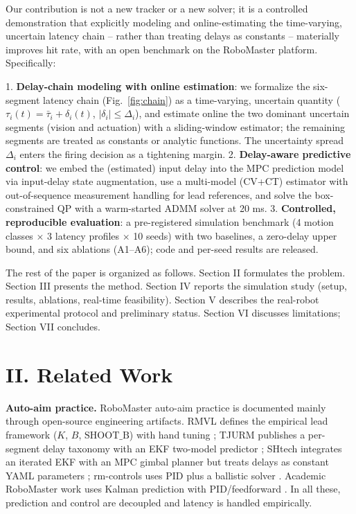 \documentclass[journal]{IEEEtran}
\begin{document}
Our contribution is not a new tracker or a new solver; it is a controlled demonstration that explicitly modeling and online-estimating the time-varying, uncertain latency chain -- rather than treating delays as constants -- materially improves hit rate, with an open benchmark on the RoboMaster platform. Specifically:

1. \textbf{Delay-chain modeling with online estimation}: we formalize the six-segment latency chain (Fig.~\ref{fig:chain}) as a time-varying, uncertain quantity ($\tau_i(t)=\bar\tau_i+\delta_i(t)$, $|\delta_i|\le\Delta_i$), and estimate online the two dominant uncertain segments (vision and actuation) with a sliding-window estimator; the remaining segments are treated as constants or analytic functions. The uncertainty spread $\Delta_i$ enters the firing decision as a tightening margin.
2. \textbf{Delay-aware predictive control}: we embed the (estimated) input delay into the MPC prediction model via input-delay state augmentation, use a multi-model (CV+CT) estimator with out-of-sequence measurement handling for lead references, and solve the box-constrained QP with a warm-started ADMM solver at 20 ms.
3. \textbf{Controlled, reproducible evaluation}: a pre-registered simulation benchmark (4 motion classes $\times$ 3 latency profiles $\times$ 10 seeds) with two baselines, a zero-delay upper bound, and six ablations (A1--A6); code and per-seed results are released.

The rest of the paper is organized as follows. Section II formulates the problem. Section III presents the method. Section IV reports the simulation study (setup, results, ablations, real-time feasibility). Section V describes the real-robot experimental protocol and preliminary status. Section VI discusses limitations; Section VII concludes.

\section*{II. Related Work}
\textbf{Auto-aim practice.} RoboMaster auto-aim practice is documented mainly through open-source engineering artifacts. RMVL defines the empirical lead framework ($K$, $B$, $\mathrm{SHOOT\_B}$) with hand tuning \cite{ref1}; TJURM publishes a per-segment delay taxonomy with an EKF two-model predictor \cite{ref2}; SHtech integrates an iterated EKF with an MPC gimbal planner but treats delays as constant YAML parameters \cite{ref3}; rm-controls uses PID plus a ballistic solver \cite{ref4}. Academic RoboMaster work uses Kalman prediction with PID/feedforward \cite{ref12}\cite{ref13}. In all these, prediction and control are decoupled and latency is handled empirically.
\end{document}
